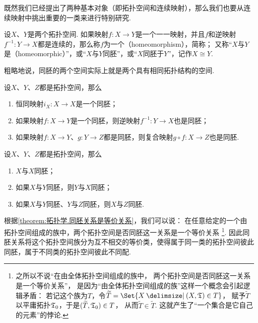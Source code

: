 既然我们已经提出了两种基本对象（即拓扑空间和连续映射），那么我们也要从连续映射中挑出重要的一类来进行特别研究.

\begin{definition}\label{definition:拓扑学.同胚映射的概念}
设\(X\)、\(Y\)是两个拓扑空间.
如果映射\(f\colon X \to Y\)是一个一一映射，并且\(f\)和逆映射\(f^{-1}\colon Y \to X\)都是连续的，那么称\(f\)为一个（homeomorphism），简称；
又称“\(X\)与\(Y\)是（homeomorphic）”，或“\(X\)与\(Y\)同胚”，或“\(X\)同胚于\(Y\)”，记作\(X \cong Y\).
\end{definition}

粗略地说，同胚的两个空间实际上就是两个具有相同拓扑结构的空间.

\begin{theorem}\label{theorem:拓扑学.同胚映射的性质}
设\(X\)、\(Y\)、\(Z\)都是拓扑空间，那么
\begin{enumerate}
\item 恒同映射\(i_X\colon X \to X\)是一个同胚；
\item 如果映射\(f\colon X \to Y\)是一个同胚，则逆映射\(f^{-1}\colon Y \to X\)也是同胚；
\item 如果映射\(f\colon X \to Y\)、\(g\colon Y \to Z\)都是同胚，则复合映射\(g \circ f\colon X \to Z\)也是同胚.
\end{enumerate}
\end{theorem}

\begin{theorem}\label{theorem:拓扑学.同胚关系是等价关系}
设\(X\)、\(Y\)、\(Z\)都是拓扑空间，那么
\begin{enumerate}
\item \(X\)与\(X\)同胚；
\item 如果\(X\)与\(Y\)同胚，则\(Y\)与\(X\)同胚；
\item 如果\(X\)与\(Y\)同胚、\(Y\)与\(Z\)同胚，则\(X\)与\(Z\)同胚.
\end{enumerate}
\end{theorem}
根据\cref{theorem:拓扑学.同胚关系是等价关系}，我们可以说：
在任意给定的一个由拓扑空间组成的族中，两个拓扑空间是否同胚这一关系是一个等价关系
\footnote{%
之所以不说“在由全体拓扑空间组成的族中，
两个拓扑空间是否同胚这一关系是一个等价关系”，
是因为“由全体拓扑空间组成的族”这样一个概念会引起逻辑矛盾：
若记这个族为\(T\)，令\(\widetilde{T} = \Set{ X \given (X,\T) \in T }\)，
赋予\(\widetilde{T}\)以平庸拓扑\(\mathfrak T_0\)，于是\((\widetilde{T},\mathfrak T_0) \in T\)，
从而\(\widetilde{T} \in \widetilde{T}\).
这就产生了“一个集合是它自己的元素”的悖论.
}.
因此同胚关系将这个拓扑空间族分为互不相交的等价类，使得属于同一类的拓扑空间彼此同胚，属于不同类的拓扑空间彼此不同配.

